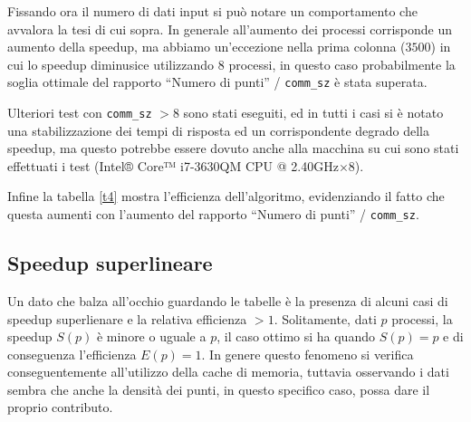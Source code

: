\documentclass[a4paper, 11pt]{article}
\theoremstyle{definition}
\theoremstyle{remark}
\begin{document}
Fissando ora il numero di dati input si può notare un comportamento che avvalora
la tesi di cui sopra. In generale all'aumento dei processi corrisponde un
aumento della speedup, ma abbiamo un'eccezione nella prima colonna ($3500$) in
cui lo speedup diminusice utilizzando $8$ processi, in questo caso
probabilmente la soglia ottimale del rapporto ``Numero di punti'' /
\texttt{comm\_sz} è stata superata.

Ulteriori test con \texttt{comm\_sz} $> 8$ sono stati eseguiti, ed in tutti i
casi si è notato una stabilizzazione dei tempi di risposta ed un corrispondente
degrado della speedup, ma questo potrebbe essere dovuto anche alla macchina su
cui sono stati effettuati i test (Intel® Core™ i7-3630QM CPU @
2.40GHz$\times$8).

Infine la tabella \ref{t4} mostra l'efficienza dell'algoritmo, evidenziando
il fatto che questa aumenti con l'aumento del rapporto ``Numero di punti'' /
\texttt{comm\_sz}.

\subsection{Speedup superlineare}
Un dato che balza all'occhio guardando le tabelle è la presenza di alcuni casi
di speedup superlienare e
la relativa efficienza $>1$. Solitamente, dati $p$ processi, la speedup
$S(p)$ è minore o uguale a $p$, il caso ottimo si ha quando $S(p) = p$ e di
conseguenza l'efficienza $E(p) = 1$. In genere questo fenomeno si verifica
conseguentemente all'utilizzo della cache di memoria, tuttavia osservando i dati
sembra che anche la densità dei punti, in questo specifico caso, possa dare
il proprio contributo.
\end{document}
